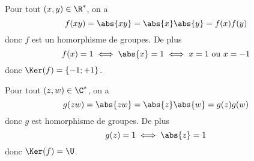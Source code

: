 Pour tout $(x,y)\in\R^*$, on a
\[
  f(xy) = \abs{xy} = \abs{x}\abs{y} = f(x)f(y)
\]
donc $f$ est un homorphisme de groupes. De plus
\[
  f(x) = 1 \iff \abs{x} = 1 \iff x = 1\text{ ou }x = -1
\]
donc $\Ker(f)=\{-1; +1\}$.

Pour tout $(z,w)\in\C^*$, on a
\[
  g(zw) = \abs{zw} = \abs{z}\abs{w} = g(z)g(w)
\]
donc $g$ est homorphisme de groupes. De plus
\[
  g(z)=1 \iff \abs{z} = 1
\]
donc $\Ker(f)=\U$.


